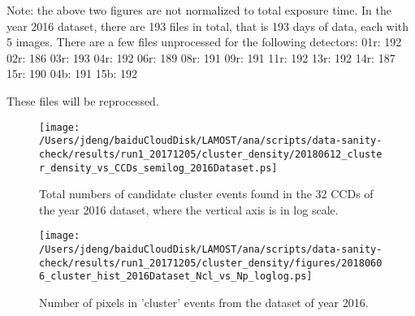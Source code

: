 \documentclass[12pt,twoside,letterpaper]{article}
\begin{document}
Note: the above two figures are not normalized to total exposure time.
In the year 2016 dataset, there are 193 files in total, that
is 193 days of data, each with 5 images. There are a few files
unprocessed for the following detectors: 
    01r:  192
    02r:  186
    03r:  193
    04r:  192
    06r:  189
    08r:  191
    09r:  191
    11r:  192
    13r:  192
    14r:  187
    15r:  190
    04b:  191
    15b:  192

These files will be reprocessed. %


   \begin{figure}[!htbp]
   \begin{center}
       \texttt{[image: /Users/jdeng/baiduCloudDisk/LAMOST/ana/scripts/data-sanity-check/results/run1\_20171205/cluster\_density/20180612\_cluster\_density\_vs\_CCDs\_semilog\_2016Dataset.ps]}
       \caption{Total numbers of candidate cluster events found in the 32 CCDs of the year 2016 dataset, where the vertical axis is in log scale.}  
       \label{Fig:Semilog_CluVsIDet}
   \end{center}    
   \end{figure}



   \begin{figure}[!htbp]
   \begin{center}
       \texttt{[image: /Users/jdeng/baiduCloudDisk/LAMOST/ana/scripts/data-sanity-check/results/run1\_20171205/cluster\_density/figures/20180606\_cluster\_hist\_2016Dataset\_Ncl\_vs\_Np\_loglog.ps]}
       \caption{Number of pixels in 'cluster' events from the dataset of year 2016.}  
       \label{Fig:CluVsPix}
   \end{center}    
   \end{figure}


\end{document}
